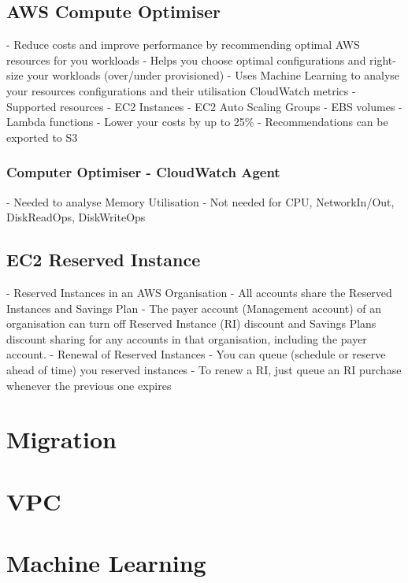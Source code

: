 \documentclass[11pt]{book}
\begin{document}


    \section{AWS Compute Optimiser}
    - Reduce costs and improve performance by recommending optimal AWS resources for you workloads
    - Helps you choose optimal configurations and right-size your workloads (over/under provisioned)
    - Uses Machine Learning to analyse your resources configurations and their utilisation CloudWatch metrics
    - Supported resources
    - EC2 Instances
    - EC2 Auto Scaling Groups
    - EBS volumes
    - Lambda functions
    - Lower your costs by up to 25\%
    - Recommendations can be exported to S3

    \subsection{Computer Optimiser - CloudWatch Agent}
    - Needed to analyse Memory Utilisation
    - Not needed for CPU, NetworkIn/Out, DiskReadOps, DiskWriteOps


    \section{EC2 Reserved Instance}
    - Reserved Instances in an AWS Organisation
    - All accounts share the Reserved Instances and Savings Plan
    - The payer account (Management account) of an organisation can turn off Reserved Instance (RI) discount and Savings Plans discount sharing for any accounts in that organisation, including the payer account.
    - Renewal of Reserved Instances
    - You can queue (schedule or reserve ahead of time) you reserved instances
    - To renew a RI, just queue an RI purchase whenever the previous one expires


    \chapter{Migration}


    \chapter{VPC}


    \chapter{Machine Learning}
\end{document}

